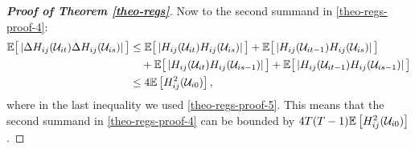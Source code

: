 \documentclass[a4paper,12pt]{article}
\begin{document}
\begin{proof}[\textnormal{\textbf{Proof of Theorem \ref{theo-regs}}}]
Now to the second summand in \eqref{theo-regs-proof-4}:
\begin{align*}
\mathbb{E} \big[ \left|\Delta  H_{ij} (\mathcal{U}_{it}) \Delta  H_{ij} (\mathcal{U}_{is})\right| \big] &\leq \mathbb{E} \big[ \left| H_{ij} (\mathcal{U}_{it}) H_{ij} (\mathcal{U}_{is}) \right|\big] + \mathbb{E} \big[ \left| H_{ij} (\mathcal{U}_{it-1}) H_{ij} (\mathcal{U}_{is}) \right|\big] \\
&\quad + \mathbb{E} \big[ \left| H_{ij} (\mathcal{U}_{it}) H_{ij} (\mathcal{U}_{is-1}) \right|\big] + \mathbb{E} \big[ \left| H_{ij} (\mathcal{U}_{it-1}) H_{ij} (\mathcal{U}_{is-1}) \right|\big] \\
&\leq  4\mathbb{E} \left[ H^2_{ij}(\mathcal{U}_{i0}) \right],
\end{align*}
where in the last inequality we used \eqref{theo-regs-proof-5}. This means that the second summand in \eqref{theo-regs-proof-4} can be bounded by $4T(T-1) \mathbb{E} \left[ H^2_{ij} (\mathcal{U}_{i0}) \right]$.


\end{proof}
\end{document}
